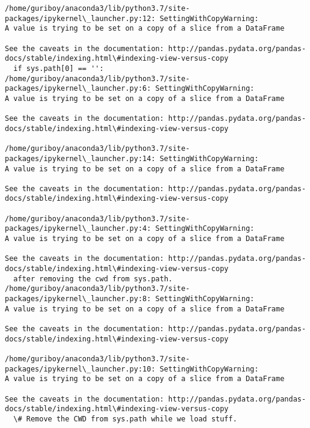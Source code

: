 \documentclass[11pt]{article}
\begin{document}
    \begin{Verbatim}[commandchars=\\\{\}]
/home/guriboy/anaconda3/lib/python3.7/site-packages/ipykernel\_launcher.py:12: SettingWithCopyWarning: 
A value is trying to be set on a copy of a slice from a DataFrame

See the caveats in the documentation: http://pandas.pydata.org/pandas-docs/stable/indexing.html\#indexing-view-versus-copy
  if sys.path[0] == '':
/home/guriboy/anaconda3/lib/python3.7/site-packages/ipykernel\_launcher.py:6: SettingWithCopyWarning: 
A value is trying to be set on a copy of a slice from a DataFrame

See the caveats in the documentation: http://pandas.pydata.org/pandas-docs/stable/indexing.html\#indexing-view-versus-copy
  
/home/guriboy/anaconda3/lib/python3.7/site-packages/ipykernel\_launcher.py:14: SettingWithCopyWarning: 
A value is trying to be set on a copy of a slice from a DataFrame

See the caveats in the documentation: http://pandas.pydata.org/pandas-docs/stable/indexing.html\#indexing-view-versus-copy
  
/home/guriboy/anaconda3/lib/python3.7/site-packages/ipykernel\_launcher.py:4: SettingWithCopyWarning: 
A value is trying to be set on a copy of a slice from a DataFrame

See the caveats in the documentation: http://pandas.pydata.org/pandas-docs/stable/indexing.html\#indexing-view-versus-copy
  after removing the cwd from sys.path.
/home/guriboy/anaconda3/lib/python3.7/site-packages/ipykernel\_launcher.py:8: SettingWithCopyWarning: 
A value is trying to be set on a copy of a slice from a DataFrame

See the caveats in the documentation: http://pandas.pydata.org/pandas-docs/stable/indexing.html\#indexing-view-versus-copy
  
/home/guriboy/anaconda3/lib/python3.7/site-packages/ipykernel\_launcher.py:10: SettingWithCopyWarning: 
A value is trying to be set on a copy of a slice from a DataFrame

See the caveats in the documentation: http://pandas.pydata.org/pandas-docs/stable/indexing.html\#indexing-view-versus-copy
  \# Remove the CWD from sys.path while we load stuff.

    \end{Verbatim}
\end{document}
